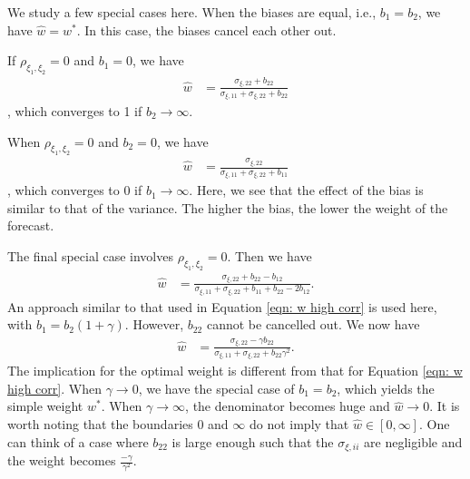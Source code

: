 \documentclass[11pt]{article}
\begin{document}
	We study a few special cases here. When the biases are equal, i.e., $b_1=b_2$, we have $\hat{w}=w^*$. In this case, the biases cancel each other out. 
	
	If $\rho_{\xi_1,\xi_2}=0$ and $b_1=0$, we have
	\begin{equation}
	\begin{aligned}
	\hat{w} &= \frac{\sigma_{\xi,22}+b_{22}}{\sigma_{\xi,11}+\sigma_{\xi,22}+b_{22}}
	\end{aligned}
	\end{equation},
	which converges to 1 if $b_2 \to \infty$.
	
	When $\rho_{\xi_1,\xi_2}=0$ and $b_2=0$, we have
	\begin{equation}
	\begin{aligned}
	\hat{w} &= \frac{\sigma_{\xi,22}}{\sigma_{\xi,11}+\sigma_{\xi,22}+b_{11}}
	\end{aligned}
	\end{equation},
	which converges to 0 if $b_1 \to \infty$. Here, we see that the effect of the bias is similar to that of the variance. The higher the bias, the lower the weight of the forecast.
	
	The final special case involves $\rho_{\xi_1,\xi_2}=0$. Then we have
	\begin{equation}
	\begin{aligned}
	\hat{w} &= \frac{\sigma_{\xi,22}+b_{22}-b_{12}}{\sigma_{\xi,11}+\sigma_{\xi,22}+b_{11}+b_{22}-2b_{12}}.
	\end{aligned}
	\end{equation}
	An approach similar to that used in Equation \ref{eqn: w high corr} is used here, with $b_1 = b_2 (1+\gamma)$. However, $b_{22}$ cannot be cancelled out. We now have
	\begin{equation}
	\begin{aligned}
	\hat{w} &= \frac{\sigma_{\xi,22}-\gamma b_{22}}{\sigma_{\xi,11}+\sigma_{\xi,22}+b_{22}\gamma^2}.
	\end{aligned}
	\end{equation}
	The implication for the optimal weight is different from that for Equation \ref{eqn: w high corr}. When $\gamma \to 0$, we have the special case of $b_1=b_2$, which yields the simple weight $w^*$. When $\gamma \to \infty$, the denominator becomes huge and $\hat{w} \to 0$. It is worth noting that the boundaries 0 and $\infty$ do not imply that $\hat{w} \in [0,\infty]$. One can think of a case where $b_{22}$ is large enough such that the $\sigma_{\xi,ii}$ are negligible and the weight becomes $\frac{-\gamma}{\gamma^2}$. 
	
\end{document}
